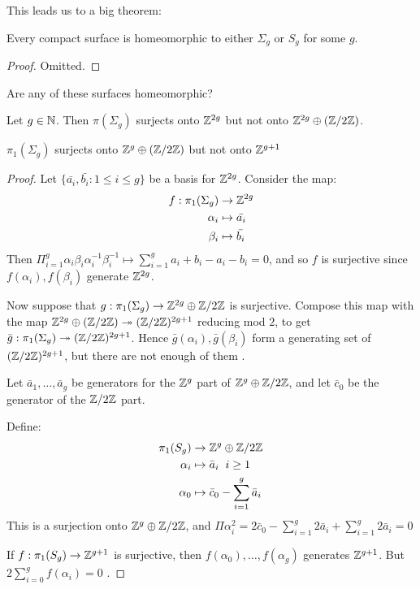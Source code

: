 \documentclass[10pt,a4paper]{article}
\begin{document}
This leads us to a big theorem:
\begin{theorem}
Every compact surface is homeomorphic to either $\Sigma_g$ or $S_g$ for some $g$.
\end{theorem}
\begin{proof}
Omitted.
\end{proof}
Are any of these surfaces homeomorphic?
\begin{lemma}
Let $g \in \mathbb{N}$. Then $\pi(\Sigma_g)$ surjects onto $\mathbb{Z}^{2g}$ but not onto $\mathbb{Z}^{2g}\oplus (\mathbb{Z}/2\mathbb{Z})$.

$\pi_1(\Sigma_g)$ surjects onto $\mathbb{Z}^g \oplus(\mathbb{Z}/2\mathbb{Z})$ but not onto $\mathbb{Z}^{g+1}$
\end{lemma}
\begin{proof}
Let $\{\bar{a_i}, \bar{b_i} : 1\leq i \leq g\}$ be a basis for $\mathbb{Z}^{2g}$. Consider the map:
\begin{align*}
f:\pi_1(\Sigma_g) &\to \mathbb{Z}^{2g}\\
\alpha_i &\mapsto \bar{a_i}\\
\beta_i &\mapsto \bar{b_i}
\end{align*}
Then $\Pi_{i=1}^g \alpha_i\beta_i\alpha_i^{-1}\beta_i^{-1} \mapsto \sum_{i=1}^g a_i + b_i - a_i - b_i = 0$, and so $f$ is surjective since $f(\alpha_i), f(\beta_i)$ generate $\mathbb{Z}^{2g}$. 

Now suppose that $g: \pi_1(\Sigma_g) \to \mathbb{Z}^{2g}\oplus \mathbb{Z}/2\mathbb{Z}$ is surjective. Compose this map with the map $\mathbb{Z}^{2g} \oplus (\mathbb{Z}/2\mathbb{Z}) \twoheadrightarrow (\mathbb{Z}/2\mathbb{Z})^{2g+1}$ reducing mod $2$, to get $\bar{g}:\pi_1(\Sigma_g) \twoheadrightarrow (\mathbb{Z}/2\mathbb{Z})^{2g+1}$. Hence $\bar{g}(\alpha_i), \bar{g}(\beta_i)$ form a generating set of $(\mathbb{Z}/2\mathbb{Z})^{2g+1}$, but there are not enough of them \contr.

Let $\bar{a}_1, \ldots, \bar{a}_g$ be generators for the $\mathbb{Z}^g$ part of $\mathbb{Z}^g \oplus \mathbb{Z}/2\mathbb{Z}$, and let $\bar{c}_0$ be the generator of the $\mathbb{Z}/2\mathbb{Z}$ part.

Define:
\begin{align*}
\pi_1(S_g) &\to \mathbb{Z}^g\oplus \mathbb{Z}/2\mathbb{Z}\\
\alpha_i &\mapsto \bar{a}_i\;\;i\geq 1\\
\alpha_0 &\mapsto \bar{c}_0 - \sum_{i=1}^g \bar{a}_i
\end{align*}
This is a surjection onto $\mathbb{Z}^g \oplus \mathbb{Z}/2\mathbb{Z}$, and $\Pi \alpha_i^2 = 2\bar{c}_0-\sum_{i=1}^g 2\bar{a}_i + \sum_{i=1}^g 2\bar{a}_i = 0$

If $f:\pi_1(S_g) \to \mathbb{Z}^{g+1}$ is surjective, then $f(\alpha_0), \ldots, f(\alpha_g)$ generates $\mathbb{Z}^{g+1}$. But $2\sum_{i=0}^g f(\alpha_i) = 0$ \contr.
\end{proof}
\end{document}
